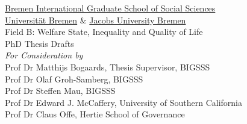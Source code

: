 \begin{titlepage}

\centering

\thispagestyle{empty}

\vspace*{\fill}

			{\Large \href{http://www.bigsss-bremen.de}{Bremen International Graduate School of Social Sciences}}\\
			{\Large \href{http://www.uni-bremen.de}{Universit\"at Bremen} \& \href{http://www.jacobs-university.de}{Jacobs University Bremen}}\\ \vspace{15pt}
			{\Large Field B: Welfare State, Inequality and Quality of Life}\\
			 \vspace{50pt} 
			{\Large PhD Thesis Drafts}\\ 	\vspace{30pt}
			{\Large \emph{For Consideration by}} \\ \vspace{30pt}
			{\large Prof Dr Matthijs Bogaards, Thesis Supervisor, BIGSSS}\\
			{\large Prof Dr Olaf Groh-Samberg, BIGSSS}\\ 
			{\large Prof Dr Steffen Mau, BIGSSS}\\
	\vspace{10pt}
			{\large Prof Dr Edward J. McCaffery, University of Southern California}\\
			{\large Prof Dr Claus Offe, Hertie School of Governance}\\
			\vspace{30pt} 

\vspace*{\fill}
	
\end{titlepage}
